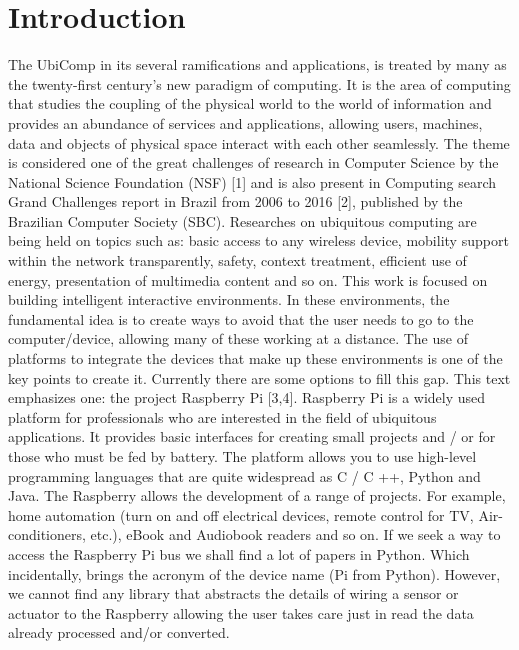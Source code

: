\documentclass{acm_proc_article-sp}
\begin{document}
\section*{Introduction}
The UbiComp in its several ramifications and applications, is treated by many as the twenty-first century's new paradigm of computing. It is the area of computing that studies the coupling of the physical world to the world of information and provides an abundance of services and applications, allowing users, machines, data and objects of physical space interact with each other seamlessly. The theme is considered one of the great challenges of research in Computer Science by the National Science Foundation (NSF) [1] and is also present in Computing search Grand Challenges report in Brazil from 2006 to 2016 [2], published by the Brazilian Computer Society (SBC).
\newline
\newline
Researches on ubiquitous computing are being held on topics such as: basic access to any wireless device, mobility support within the network transparently, safety, context treatment, efficient use of energy, presentation of multimedia content and so on. This work is focused on building intelligent interactive environments. In these environments, the fundamental idea is to create ways to avoid that the user needs to go to the computer/device, allowing many of these working at a distance. The use of platforms to integrate the devices that make up these environments is one of the key points to create it. Currently there are some options to fill this gap. This text emphasizes one: the project Raspberry Pi [3,4].
\newline
\newline
Raspberry Pi is a widely used platform for professionals who are interested in the field of ubiquitous applications. It provides basic interfaces for creating small projects and / or for those who must be fed by battery. The platform allows you to use high-level programming languages that are quite widespread as C / C ++, Python and Java. The Raspberry allows the development of a range of projects. For example, home automation (turn on and off electrical devices, remote control for TV, Air-conditioners, etc.), eBook and Audiobook readers and so on.
\newline
\newline
If we seek a way to access the Raspberry Pi bus we shall find a lot of papers in Python. Which incidentally, brings the acronym of the device name (Pi from Python). However, we cannot find any library that abstracts the details of wiring a sensor or actuator to the Raspberry allowing the user takes care just in read the data already processed and/or converted.
\end{document}
